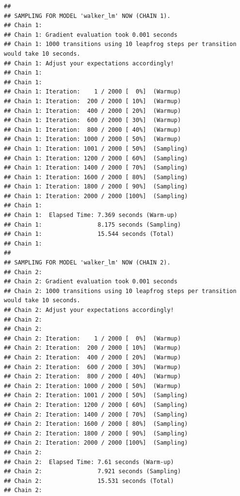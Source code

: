 \documentclass[
]{book}
\newenvironment{Shaded}{\begin{snugshade}}{\end{snugshade}}
\newcommand{\CommentTok}[1]{\textcolor[rgb]{0.56,0.35,0.01}{\textit{#1}}}
\newcommand{\DataTypeTok}[1]{\textcolor[rgb]{0.13,0.29,0.53}{#1}}
\newcommand{\FloatTok}[1]{\textcolor[rgb]{0.00,0.00,0.81}{#1}}
\newcommand{\KeywordTok}[1]{\textcolor[rgb]{0.13,0.29,0.53}{\textbf{#1}}}
\newcommand{\NormalTok}[1]{#1}
\newcommand{\OperatorTok}[1]{\textcolor[rgb]{0.81,0.36,0.00}{\textbf{#1}}}
\newcommand{\StringTok}[1]{\textcolor[rgb]{0.31,0.60,0.02}{#1}}
\begin{document}
\begin{verbatim}
## 
## SAMPLING FOR MODEL 'walker_lm' NOW (CHAIN 1).
## Chain 1: 
## Chain 1: Gradient evaluation took 0.001 seconds
## Chain 1: 1000 transitions using 10 leapfrog steps per transition would take 10 seconds.
## Chain 1: Adjust your expectations accordingly!
## Chain 1: 
## Chain 1: 
## Chain 1: Iteration:    1 / 2000 [  0%]  (Warmup)
## Chain 1: Iteration:  200 / 2000 [ 10%]  (Warmup)
## Chain 1: Iteration:  400 / 2000 [ 20%]  (Warmup)
## Chain 1: Iteration:  600 / 2000 [ 30%]  (Warmup)
## Chain 1: Iteration:  800 / 2000 [ 40%]  (Warmup)
## Chain 1: Iteration: 1000 / 2000 [ 50%]  (Warmup)
## Chain 1: Iteration: 1001 / 2000 [ 50%]  (Sampling)
## Chain 1: Iteration: 1200 / 2000 [ 60%]  (Sampling)
## Chain 1: Iteration: 1400 / 2000 [ 70%]  (Sampling)
## Chain 1: Iteration: 1600 / 2000 [ 80%]  (Sampling)
## Chain 1: Iteration: 1800 / 2000 [ 90%]  (Sampling)
## Chain 1: Iteration: 2000 / 2000 [100%]  (Sampling)
## Chain 1: 
## Chain 1:  Elapsed Time: 7.369 seconds (Warm-up)
## Chain 1:                8.175 seconds (Sampling)
## Chain 1:                15.544 seconds (Total)
## Chain 1: 
## 
## SAMPLING FOR MODEL 'walker_lm' NOW (CHAIN 2).
## Chain 2: 
## Chain 2: Gradient evaluation took 0.001 seconds
## Chain 2: 1000 transitions using 10 leapfrog steps per transition would take 10 seconds.
## Chain 2: Adjust your expectations accordingly!
## Chain 2: 
## Chain 2: 
## Chain 2: Iteration:    1 / 2000 [  0%]  (Warmup)
## Chain 2: Iteration:  200 / 2000 [ 10%]  (Warmup)
## Chain 2: Iteration:  400 / 2000 [ 20%]  (Warmup)
## Chain 2: Iteration:  600 / 2000 [ 30%]  (Warmup)
## Chain 2: Iteration:  800 / 2000 [ 40%]  (Warmup)
## Chain 2: Iteration: 1000 / 2000 [ 50%]  (Warmup)
## Chain 2: Iteration: 1001 / 2000 [ 50%]  (Sampling)
## Chain 2: Iteration: 1200 / 2000 [ 60%]  (Sampling)
## Chain 2: Iteration: 1400 / 2000 [ 70%]  (Sampling)
## Chain 2: Iteration: 1600 / 2000 [ 80%]  (Sampling)
## Chain 2: Iteration: 1800 / 2000 [ 90%]  (Sampling)
## Chain 2: Iteration: 2000 / 2000 [100%]  (Sampling)
## Chain 2: 
## Chain 2:  Elapsed Time: 7.61 seconds (Warm-up)
## Chain 2:                7.921 seconds (Sampling)
## Chain 2:                15.531 seconds (Total)
## Chain 2:
\end{verbatim}

\begin{Shaded}
\end{Shaded}
\end{document}
